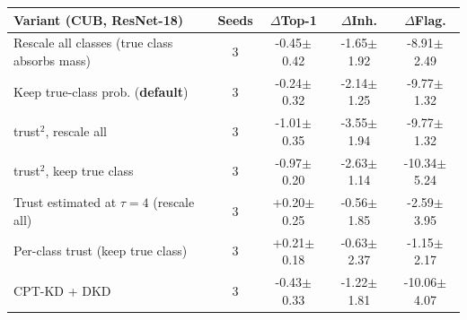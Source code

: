 \begin{tabular}{l c ccc}
\toprule
Variant (CUB, ResNet-18) & Seeds & $\Delta$Top-1 & $\Delta$Inh. & $\Delta$Flag. \\
\midrule
Rescale all classes (true class absorbs mass) & 3 & -0.45{\scriptsize$\pm$0.42} & -1.65{\scriptsize$\pm$1.92} & -8.91{\scriptsize$\pm$2.49} \\
Keep true-class prob. (\textbf{default}) & 3 & -0.24{\scriptsize$\pm$0.32} & -2.14{\scriptsize$\pm$1.25} & -9.77{\scriptsize$\pm$1.32} \\
trust$^2$, rescale all & 3 & -1.01{\scriptsize$\pm$0.35} & -3.55{\scriptsize$\pm$1.94} & -9.77{\scriptsize$\pm$1.32} \\
trust$^2$, keep true class & 3 & -0.97{\scriptsize$\pm$0.20} & -2.63{\scriptsize$\pm$1.14} & -10.34{\scriptsize$\pm$5.24} \\
Trust estimated at $\tau{=}4$ (rescale all) & 3 & +0.20{\scriptsize$\pm$0.25} & -0.56{\scriptsize$\pm$1.85} & -2.59{\scriptsize$\pm$3.95} \\
Per-class trust (keep true class) & 3 & +0.21{\scriptsize$\pm$0.18} & -0.63{\scriptsize$\pm$2.37} & -1.15{\scriptsize$\pm$2.17} \\
CPT-KD + DKD & 3 & -0.43{\scriptsize$\pm$0.33} & -1.22{\scriptsize$\pm$1.81} & -10.06{\scriptsize$\pm$4.07} \\
\bottomrule
\end{tabular}
